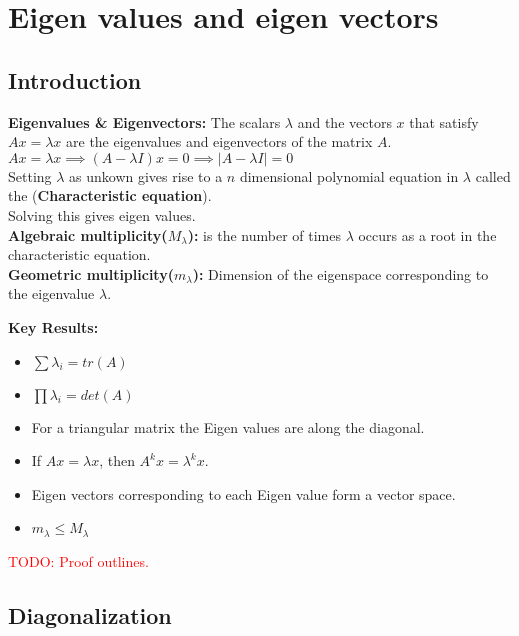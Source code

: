 \section{Eigen values and eigen vectors}

\subsection{Introduction}
\textbf{Eigenvalues \& Eigenvectors:}
The scalars $\lambda$ and the vectors $x$ that satisfy $Ax = \lambda x$ are the
eigenvalues and eigenvectors of the matrix $A$.\\
$Ax = \lambda x \implies (A - \lambda I)x = 0 \implies 
\mid A - \lambda I\mid = 0$\\

Setting $\lambda$ as unkown gives rise to a $n$ dimensional polynomial equation 
in $\lambda$ called the (\textbf{Characteristic equation}).\\
Solving this gives eigen values.\\

\textbf{Algebraic multiplicity($M_{\lambda}$):} is the number of times $\lambda$
occurs as a root in the characteristic equation.\\
\textbf{Geometric multiplicity($m_{\lambda}$):} Dimension of the eigenspace 
corresponding to the eigenvalue $\lambda$.\\ 

\begin{mdframed}[backgroundcolor=SlateGray2!40,linecolor=Firebrick4]
\textbf{Key Results:}
\begin{itemize}
\item $\sum \lambda_i = tr(A)$	
\item $\prod \lambda_i = det(A)$
\item For a triangular matrix the Eigen values are along the diagonal.
\item If $Ax = \lambda x$, then $A^kx = \lambda ^k x$.
\item Eigen vectors corresponding to each Eigen value form a vector space.
\item $m_{\lambda} \leq M_{\lambda}$
\end{itemize}
\end{mdframed}

\textcolor{red}{TODO: Proof outlines.}

\subsection{Diagonalization}


